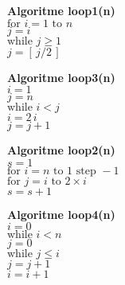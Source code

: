 \noindent
\begin{minipage}[t]{0.45\linewidth}
\textbf{Algoritme loop1(n)}\\[6pt]
\(\displaystyle \text{for } i = 1 \text{ to } n\)\\
\quad \(j = i\)\\
\quad \(\text{while } j \ge 1\)\\
\quad\quad \(j = [\,j/2\,]\)

\vspace{1.5em}

\textbf{Algoritme loop3(n)}\\[6pt]
\(\displaystyle i = 1\)\\
\(j = n\)\\
\(\text{while } i < j\)\\
\quad \(i = 2\,i\)\\
\quad \(j = j + 1\)
\end{minipage}
\hfill
\begin{minipage}[t]{0.45\linewidth}
\textbf{Algoritme loop2(n)}\\[6pt]
\(\displaystyle s = 1\)\\
\(\text{for } i = n \text{ to } 1 \text{ step } -1\)\\
\quad \(\text{for } j = i \text{ to } 2 \times i\)\\
\quad\quad \(s = s + 1\)

\vspace{1.5em}

\textbf{Algoritme loop4(n)}\\[6pt]
\(\displaystyle i = 0\)\\
\(\text{while } i < n\)\\
\quad \(j = 0\)\\
\quad \(\text{while } j \le i\)\\
\quad\quad \(j = j + 1\)\\
\quad \(i = i + 1\)
\end{minipage}
